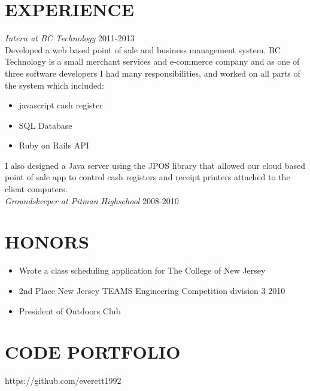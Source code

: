 \documentclass[line, margin]{res}
\begin{document}
\begin{resume}
    \section{EXPERIENCE}
    \textit{Intern at BC Technology} \hfill 2011-2013 \\
    Developed a web based point of sale and business management system.
    BC Technology is a small merchant services and e-commerce company and as one of three software developers
    I had many responsibilities, and worked on all parts of the system which included:
    \begin{itemize}
      \item javascript cash register
      \item SQL Database
      \item Ruby on Rails API
    \end{itemize}
    I also designed a Java server using the JPOS library that allowed our cloud based point of sale app
    to control cash registers and receipt printers attached to the client computers. \\
    \textit{Groundskeeper at Pitman Highschool} \hfill 2008-2010 \\
    \section{HONORS}
    \begin{itemize}
      \item Wrote a class scheduling application for The College of New Jersey
      \item 2nd Place New Jersey TEAMS Engineering Competition division 3 2010
      \item President of Outdoors Club
    \end{itemize}
    \section{CODE PORTFOLIO}
    https://github.com/everett1992
  \end{resume}
\end{document}
